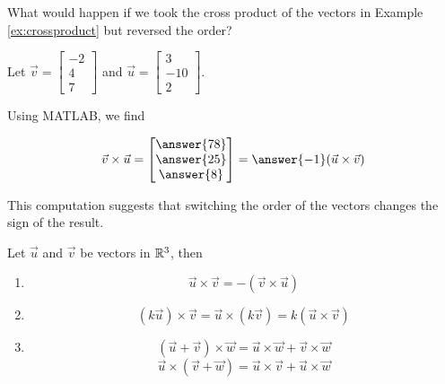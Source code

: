 \documentclass{ximera}
\begin{document}
 
\begin{exploration}\label{init:crossproduct2}
What would happen if we took the cross product of the vectors in Example \ref{ex:crossproduct} but reversed the order?
 
Let $\vec{v}=\begin{bmatrix}-2\\ 4\\ 7\end{bmatrix}$ and $\vec{u}=\begin{bmatrix}3\\ -10\\ 2\end{bmatrix}$.

Using MATLAB, we find 

$$
\vec{v}\times \vec{u}
=\begin{bmatrix}\answer{78}\\ \answer{25}\\ \answer{8}\end{bmatrix}=\answer{-1}(\vec{u}\times\vec{v})$$
 
This computation suggests that switching the order of the vectors changes the sign of the result.
\end{exploration}
 
\begin{theorem}\label{th:corssuvnegcrossvu}
Let $\vec{u}$ and $\vec{v}$ be vectors in $\mathbb{R}^3$, then
\begin{enumerate}
  \item $$\vec{u}\times\vec{v}=-(\vec{v}\times\vec{u})$$
\item\label{item:scalarassocofcrossprod} 
$$(k\vec{u})\times \vec{v}=\vec{u}\times (k\vec{v})=k(\vec{u}\times \vec{v})$$
\item\label{item:distofrossprod} 
$$(\vec{u}+\vec{v})\times \vec{w}=\vec{u}\times \vec{w}+\vec{v}\times \vec{w}$$
$$\vec{u}\times (\vec{v}+\vec{w})=\vec{u}\times \vec{v}+\vec{u}\times \vec{w}$$
\end{enumerate}
\end{theorem}
 
\end{document}

